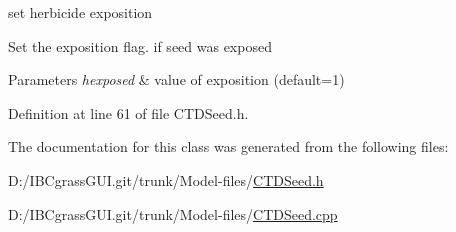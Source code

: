 set herbicide exposition 

Set the exposition flag. if seed was exposed 
\begin{DoxyParams}{Parameters}
{\em hexposed} & value of exposition (default=1) \\
\hline
\end{DoxyParams}


Definition at line 61 of file C\+T\+D\+Seed.\+h.



The documentation for this class was generated from the following files\+:\begin{DoxyCompactItemize}
\item 
D\+:/\+I\+B\+Cgrass\+G\+U\+I.\+git/trunk/\+Model-\/files/\mbox{\hyperlink{_c_t_d_seed_8h}{C\+T\+D\+Seed.\+h}}\item 
D\+:/\+I\+B\+Cgrass\+G\+U\+I.\+git/trunk/\+Model-\/files/\mbox{\hyperlink{_c_t_d_seed_8cpp}{C\+T\+D\+Seed.\+cpp}}\end{DoxyCompactItemize}
